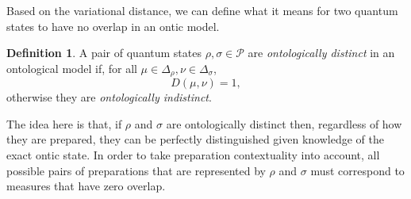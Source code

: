 \documentclass[DIV=calc,paper=a4,fontsize=11pt,twocolumn]{scrartcl} %
\theoremstyle{definition}
\newtheorem{definition}{Definition}[section]
\theoremstyle{plain}
\begin{document}
Based on the variational distance, we can define what it means for two
quantum states to have no overlap in an ontic model.
\begin{definition}
A pair of quantum states $\rho, \sigma \in \mathcal{P}$ are
\emph{ontologically distinct} in an ontological model if, for all
$\mu \in \Delta_{\rho}, \nu \in \Delta_{\sigma}$,
\begin{equation}
D(\mu,\nu) = 1,
\end{equation}
otherwise they are \emph{ontologically indistinct}.
\end{definition}
The idea here is that, if $\rho$ and $\sigma$ are ontologically
distinct then, regardless of how they are prepared, they can be
perfectly distinguished given knowledge of the exact ontic state.  In
order to take preparation contextuality into account, all possible
pairs of preparations that are represented by $\rho$ and $\sigma$ must
correspond to measures that have zero overlap.
\end{document}
